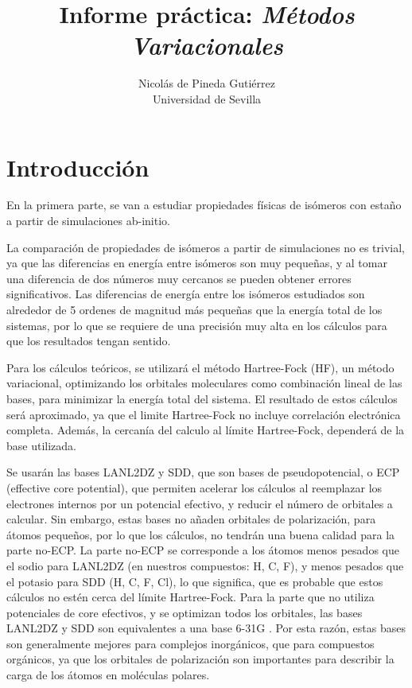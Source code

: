 \documentclass[12pt]{article}
\title{Informe práctica: \textit{Métodos Variacionales}}
\author{Nicolás de Pineda Gutiérrez \\[1ex] 
\small Universidad de Sevilla}
\date{}
\begin{document}
\maketitle
\thispagestyle{empty}

\renewcommand{\contentsname}{Contenido}
\newpage
\tableofcontents 

\newpage
\section{Introducción}

En la primera parte, se van a estudiar propiedades físicas de isómeros con estaño a partir de simulaciones ab-initio.

La comparación de propiedades de isómeros a partir de simulaciones no es trivial, ya que las diferencias en energía entre isómeros son muy pequeñas, y al tomar una diferencia de dos números muy cercanos se pueden obtener errores significativos. Las diferencias de energía entre los isómeros estudiados son alrededor de 5 ordenes de magnitud más pequeñas que la energía total de los sistemas, por lo que se requiere de una precisión muy alta en los cálculos para que los resultados tengan sentido.

Para los cálculos teóricos, se utilizará el método Hartree-Fock (HF), un método variacional, optimizando los orbitales moleculares como combinación lineal de las bases, para minimizar la energía total del sistema. El resultado de estos cálculos será aproximado, ya que el limite Hartree-Fock no incluye correlación electrónica completa. Además, la cercanía del calculo al límite Hartree-Fock, dependerá de la base utilizada. 

Se usarán las bases LANL2DZ y SDD, que son bases de pseudopotencial, o ECP (effective core potential), que permiten acelerar los cálculos al reemplazar los electrones internos por un potencial efectivo, y reducir el número de orbitales a calcular. Sin embargo, estas bases no añaden orbitales de polarización, para átomos pequeños, por lo que los cálculos, no tendrán una buena calidad para la parte no-ECP. La parte no-ECP se corresponde a los átomos menos pesados que el sodio para LANL2DZ (en nuestros compuestos: H, C, F), y menos pesados que el potasio para SDD (H, C, F, Cl), lo que significa, que es probable que estos cálculos no estén cerca del límite Hartree-Fock. Para la parte que no utiliza potenciales de core efectivos, y se optimizan todos los orbitales, las bases LANL2DZ y SDD son equivalentes a una base 6-31G \cite{batista_gaussian}. Por esta razón, estas bases son generalmente mejores para complejos inorgánicos, que para compuestos orgánicos, ya que los orbitales de polarización son importantes para describir la carga de los átomos en moléculas polares.
\end{document}
